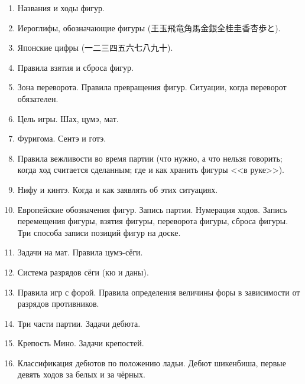 \documentclass[12pt]{article}
\begin{document}
\begin{CJK}{UTF8}{min}
\begin{enumerate}
\setlength{\parskip}{-0.3ex}\relax
\item Названия и ходы фигур.
\item Иероглифы, обозначающие фигуры (王玉飛竜角馬金銀全桂圭香杏歩と).
\item Японские цифры (一二三四五六七八九十).
\item Правила взятия и сброса фигур. 
\item Зона переворота. Правила превращения фигур. Ситуации, когда переворот обязателен.
\item Цель игры. Шах, цумэ, мат.
\item Фуригома. Сентэ и готэ.
\item Правила вежливости во время партии (что нужно, а что нельзя говорить; когда ход
считается сделанным; где и как хранить фигуры <<в руке>>).
\item Нифу и кинтэ. Когда и как заявлять об этих ситуациях.
\item Европейские обозначения фигур. Запись партии. Нумерация ходов. Запись перемещения фигуры, взятия фигуры,
переворота фигуры, сброса фигуры. Три способа записи позиций фигур на доске. 
\item Задачи на мат. Правила цумэ-сёги.
\item Система разрядов сёги (кю и даны).
\item Правила игр с форой. Правила определения величины форы в зависимости от разрядов противников.
\item Три части партии. Задачи дебюта.
\item Крепость Мино. Задачи крепостей.
\item Классификация дебютов по положению ладьи. Дебют шикенбиша, первые девять ходов за белых и за чёрных.
\end{enumerate}

\end{CJK}
\end{document}
